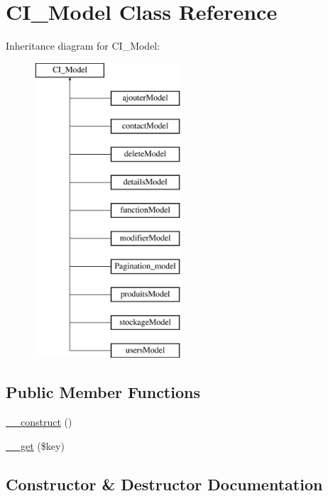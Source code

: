 \hypertarget{class_c_i___model}{}\section{C\+I\+\_\+\+Model Class Reference}
\label{class_c_i___model}
Inheritance diagram for C\+I\+\_\+\+Model\+:\begin{figure}[H]
\begin{center}
\leavevmode
\includegraphics[height=11.000000cm]{class_c_i___model}
\end{center}
\end{figure}
\subsection*{Public Member Functions}
\begin{DoxyCompactItemize}
\item 
\mbox{\hyperlink{class_c_i___model_ae3faa2e97c2dd627b0475cde8f1dbc63}{\+\_\+\+\_\+construct}} ()
\item 
\mbox{\hyperlink{class_c_i___model_a97e04f7e5b0c093f66f0bc783acd077b}{\+\_\+\+\_\+get}} (\$key)
\end{DoxyCompactItemize}


\subsection{Constructor \& Destructor Documentation}
\mbox{\label{class_c_i___model_ae3faa2e97c2dd627b0475cde8f1dbc63}} 
